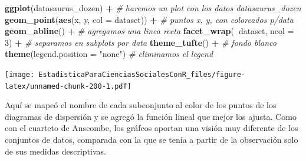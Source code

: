 \documentclass[]{book}
\newenvironment{Shaded}{\begin{snugshade}}{\end{snugshade}}
\newcommand{\CommentTok}[1]{\textcolor[rgb]{0.56,0.35,0.01}{\textit{#1}}}
\newcommand{\DataTypeTok}[1]{\textcolor[rgb]{0.13,0.29,0.53}{#1}}
\newcommand{\DecValTok}[1]{\textcolor[rgb]{0.00,0.00,0.81}{#1}}
\newcommand{\KeywordTok}[1]{\textcolor[rgb]{0.13,0.29,0.53}{\textbf{#1}}}
\newcommand{\NormalTok}[1]{#1}
\newcommand{\OperatorTok}[1]{\textcolor[rgb]{0.81,0.36,0.00}{\textbf{#1}}}
\newcommand{\StringTok}[1]{\textcolor[rgb]{0.31,0.60,0.02}{#1}}
\begin{document}
\begin{Shaded}
\begin{Highlighting}[]
\KeywordTok{ggplot}\NormalTok{(datasaurus_dozen) }\OperatorTok{+}\StringTok{ }\CommentTok{# haremos un plot con los datos datasaurus_dozen}
\StringTok{  }\KeywordTok{geom_point}\NormalTok{(}\KeywordTok{aes}\NormalTok{(x, y, }\DataTypeTok{col =}\NormalTok{ dataset)) }\OperatorTok{+}\StringTok{ }\CommentTok{# puntos x, y, con coloreados p/data}
\StringTok{  }\KeywordTok{geom_abline}\NormalTok{() }\OperatorTok{+}\StringTok{ }\CommentTok{# agregamos una linea recta}
\StringTok{  }\KeywordTok{facet_wrap}\NormalTok{(}\OperatorTok{~}\NormalTok{dataset, }\DataTypeTok{ncol =} \DecValTok{3}\NormalTok{) }\OperatorTok{+}\StringTok{ }\CommentTok{# separamos en subplots por data}
\StringTok{  }\KeywordTok{theme_tufte}\NormalTok{() }\OperatorTok{+}\StringTok{ }\CommentTok{# fondo blanco}
\StringTok{  }\KeywordTok{theme}\NormalTok{(}\DataTypeTok{legend.position =} \StringTok{"none"}\NormalTok{) }\CommentTok{# eliminamos el legend}
\end{Highlighting}
\end{Shaded}

\texttt{[image: EstadisticaParaCienciasSocialesConR\_files/figure-latex/unnamed-chunk-200-1.pdf]}

Aquí se mapeó el nombre de cada subconjunto al color de los puntos de los diagramas de dispersión y se agregó la función lineal que mejor los ajusta.
Como con el cuarteto de Anscombe, los gráfcos aportan una visión muy diferente de los conjuntos de datos, comparada con la que se tenía a partir de la observación solo de sus medidas descriptivas.


\end{document}
